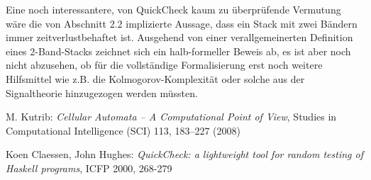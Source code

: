 \documentclass{article}
\begin{document}
Eine noch interessantere, von QuickCheck kaum zu überprüfende Vermutung wäre die von Abschnitt 2.2 implizierte Aussage, dass ein Stack mit zwei Bändern immer zeitverlustbehaftet ist. Ausgehend von einer verallgemeinerten Definition eines 2-Band-Stacks zeichnet sich ein halb-formeller Beweis ab, es ist aber noch nicht abzusehen, ob für die vollständige Formalisierung erst noch weitere Hilfsmittel wie z.B. die Kolmogorov-Komplexität oder solche aus der Signaltheorie hinzugezogen werden müssten.
\newpage
\begin{thebibliography}{9}
        M. Kutrib: \emph{Cellular Automata – A Computational Point of View}, Studies in Computational Intelligence (SCI) 113, 183–227 (2008)

        Koen Claessen, John Hughes: \emph{QuickCheck: a lightweight tool for random testing of Haskell programs}, ICFP 2000, 268-279
\end{thebibliography}
\end{document}
